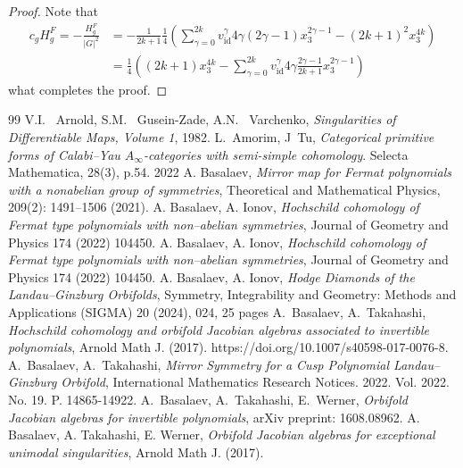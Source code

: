 \documentclass[reqno,12pt]{amsart}
\numberwithin{equation}{section}
\theoremstyle{plain}
\theoremstyle{definition}
\newcommand{\id}{\mathrm{id}}
\numberwithin{equation}{section}
\begin{document}
\begin{proof}
Note that 
\begin{align*}
 c_gH^F_g = -\frac{H^F_g}{|G|^2} &= -\frac{1}{2k+1} \frac{1}{4} \left( \sum_{\gamma=0}^{2k} v^{\gamma}_{\id} 4\gamma(2\gamma-1)x_3^{2\gamma-1} - (2k+1)^2 x_3^{4k} \right)
 \\
 &=  \frac{1}{4} \left( (2k+1) x_3^{4k} - \sum_{\gamma=0}^{2k} v^{\gamma}_{\id} 4\gamma \frac{2\gamma-1}{2k+1}x_3^{2\gamma-1} \right)
\end{align*}
what completes the proof.

\end{proof}


\begin{thebibliography}{99}
     V.I. ~Arnold, S.M. ~Gusein-Zade, A.N. ~Varchenko, \emph{Singularities of Differentiable Maps, Volume 1}, 1982.
    L.~Amorim, J~Tu, \emph{Categorical primitive forms of Calabi–Yau $A_\infty$-categories with semi-simple cohomology}. Selecta Mathematica, 28(3), p.54. 2022
     A. Basalaev, \emph{Mirror map for Fermat polynomials with a nonabelian group of symmetries}, Theoretical and Mathematical Physics, 209(2): 1491–1506 (2021).
     A. Basalaev, A. Ionov, \emph{Hochschild cohomology of Fermat type polynomials with
non--abelian symmetries}, Journal of Geometry and Physics 174 (2022) 104450.
     A. Basalaev, A. Ionov, \emph{Hochschild cohomology of Fermat type polynomials with
non--abelian symmetries}, Journal of Geometry and Physics 174 (2022) 104450.
     A. Basalaev, A. Ionov, \emph{Hodge Diamonds of the Landau–Ginzburg Orbifolds}, Symmetry, Integrability and Geometry: Methods and Applications (SIGMA) 20 (2024), 024, 25 pages 
	A.~Basalaev, A.~Takahashi, \emph{Hochschild cohomology and orbifold Jacobian algebras associated to invertible polynomials}, Arnold Math J. (2017). https://doi.org/10.1007/s40598-017-0076-8.
	A.~Basalaev, A.~Takahashi, \emph{Mirror Symmetry for a Cusp Polynomial Landau–Ginzburg Orbifold}, International Mathematics Research Notices. 2022. Vol. 2022. No. 19. P. 14865-14922.
	A.~Basalaev, A.~Takahashi, E.~Werner, \emph{Orbifold Jacobian algebras for invertible polynomials}, arXiv preprint: 1608.08962.
    A. Basalaev, A. Takahashi, E. Werner, \emph{Orbifold Jacobian algebras for exceptional unimodal singularities}, Arnold Math J. (2017).

\end{thebibliography}
\end{document}
